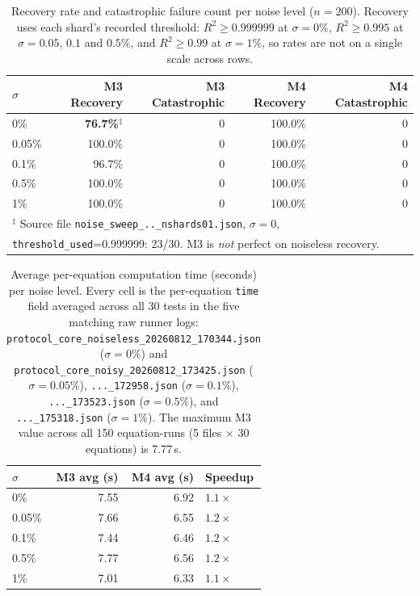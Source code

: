 \documentclass[twoside,11pt]{article}
\newcommand{\Rsq}{R^{2}}
\begin{document}
\begin{table}[H]
\centering
\caption{Recovery rate and catastrophic failure count per noise level ($n=200$).
Recovery uses each shard's recorded threshold: $\Rsq\geq0.999999$ at
$\sigma=0\%$, $\Rsq\geq0.995$ at $\sigma=0.05$, $0.1$ and $0.5\%$, and
$\Rsq\geq0.99$ at $\sigma=1\%$, so rates are not on a single scale across
rows.
}
\label{tab:rr_noise}
\small
\begin{tabular}{lrrrr}
\toprule
$\sigma$ & M3 Recovery & M3 Catastrophic & M4 Recovery & M4 Catastrophic\\
\midrule
0\%    & \textbf{76.7\%$^\ddagger$} & 0 & 100.0\% & 0\\
0.05\% & 100.0\%          & 0 & 100.0\% & 0\\
0.1\%  & 96.7\%           & 0 & 100.0\% & 0\\
0.5\%  & 100.0\%          & 0 & 100.0\% & 0\\
1\%    & 100.0\%          & 0 & 100.0\% & 0\\
\bottomrule
\multicolumn{5}{l}{\footnotesize$^\ddagger$ Source file \texttt{noise\_sweep\_..\_nshards01.json}, $\sigma=0$,}\\
\multicolumn{5}{l}{\footnotesize \texttt{threshold\_used}=0.999999: 23/30. M3 is \emph{not} perfect on noiseless recovery.}\\
\end{tabular}
\end{table}

\begin{table}[H]
\centering
\caption{Average per-equation computation time (seconds) per noise level.
Every cell is the per-equation \texttt{time} field averaged across all 30 tests in the five matching raw runner logs: \texttt{protocol\_core\_noiseless\_20260812\_170344.json} ($\sigma=0\%$) and \texttt{protocol\_core\_noisy\_20260812\_173425.json} ($\sigma=0.05\%$), \texttt{...\_172958.json} ($\sigma=0.1\%$), \texttt{...\_173523.json} ($\sigma=0.5\%$), and \texttt{...\_175318.json} ($\sigma=1\%$). The maximum M3 value across all 150 equation-runs (5 files $\times$ 30 equations) is 7.77\,s.}
\label{tab:time_noise}
\small
\begin{tabular}{lrrl}
\toprule
$\sigma$ & \textcolor{m3blue}{M3 avg (s)} & \textcolor{m4red}{M4 avg (s)} & Speedup\\
\midrule
0\%    & 7.55 & 6.92 & $1.1\times$\\
0.05\% & 7.66 & 6.55 & $1.2\times$\\
0.1\%  & 7.44 & 6.46 & $1.2\times$\\
0.5\%  & 7.77 & 6.56 & $1.2\times$\\
1\%    & 7.01 & 6.33 & $1.1\times$\\
\bottomrule
\end{tabular}
\end{table}
\end{document}
